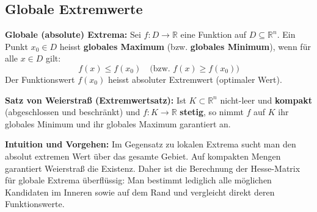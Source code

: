 \subsection{Globale Extremwerte}

\begin{definition}
    \textbf{Globale (absolute) Extrema:} Sei $f: D \to \mathbb{R}$ eine Funktion auf $D \subseteq \mathbb{R}^n$. Ein Punkt $x_0 \in D$ heisst \textbf{globales Maximum} (bzw. \textbf{globales Minimum}), wenn für alle $x \in D$ gilt:
    $$ f(x) \le f(x_0) \quad \text{(bzw. } f(x) \ge f(x_0) \text{)} $$
    Der Funktionswert $f(x_0)$ heisst absoluter Extremwert (optimaler Wert).
\end{definition}

\begin{theorem}
    \textbf{Satz von Weierstraß (Extremwertsatz):} Ist $K \subset \mathbb{R}^n$ nicht-leer und \textbf{kompakt} (abgeschlossen und beschränkt) und $f: K \to \mathbb{R}$ \textbf{stetig}, so nimmt $f$ auf $K$ ihr globales Minimum und ihr globales Maximum garantiert an.
\end{theorem}

\begin{remark}
    \textbf{Intuition und Vorgehen:} Im Gegensatz zu lokalen Extrema sucht man den absolut extremen Wert über das gesamte Gebiet. Auf kompakten Mengen garantiert Weierstraß die Existenz. Daher ist die Berechnung der Hesse-Matrix für globale Extrema überflüssig: Man bestimmt lediglich alle möglichen Kandidaten im Inneren sowie auf dem Rand und vergleicht direkt deren Funktionswerte.
\end{remark}

